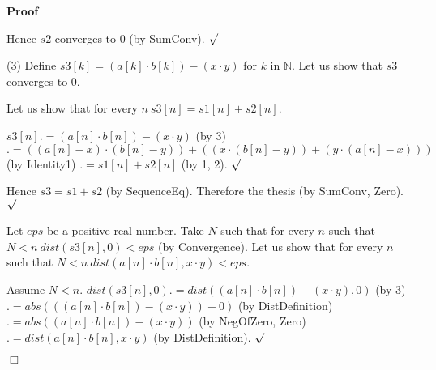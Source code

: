 \documentclass{article}
\newenvironment{forthel}{\begin{leftbar}}{\end{leftbar}}
\newenvironment{proof}{\noindent\textbf{Proof\ }}{\hspace*{\fill}$\Box$\medskip}
\newenvironment{subproof}{\begin{list}{}{}
		\item[\text{Proof}]}{\hfill $\surd$ \end{list}}
\newcommand{\NN}{\mathbb{N}}
\newcommand{\plusone}{+}
\begin{document}
\begin{forthel}
\begin{proof}
\begin{subproof}
	Hence $s2$ converges to $0$ (by SumConv).
	\end{subproof}
	(3) Define $s3[k] = (a[k] \cdot b[k]) - (x \cdot y)$ for $k$ in $\NN$.
	Let us show that $s3$ converges to $0$.
	\begin{subproof}
	Let us show that for every $n \ s3[n] = s1[n] + s2[n]$.
	\begin{subproof}
	$s3[n] .= (a[n] \cdot b[n]) - (x \cdot y)$ (by 3)
	$.= ((a[n] - x) \cdot (b[n] - y)) + ((x \cdot (b[n] - y)) + (y \cdot (a[n] - x)))$ (by Identity1)
	$.= s1[n] + s2[n]$ (by 1, 2).
	\end{subproof}
	Hence $s3 = s1 \plusone s2$ (by SequenceEq).
	Therefore the thesis (by SumConv, Zero).
	\end{subproof}
	Let $eps$ be a positive real number.
	Take $N$ such that for every $n$ such that $N < n \ dist(s3[n],0) < eps$ (by Convergence).
	Let us show that for every $n$ such that $N < n \ dist(a[n] \cdot b[n],x \cdot y) < eps$.
	\begin{subproof}
	Assume $N < n$.
	$dist(s3[n],0) .= dist((a[n] \cdot b[n]) - (x \cdot y),0)$ (by 3)
	$.= abs(((a[n] \cdot b[n]) - (x \cdot y)) - 0)$ (by DistDefinition)
	$.= abs((a[n] \cdot b[n]) - (x \cdot y))$ (by NegOfZero, Zero)
	$.= dist(a[n] \cdot b[n],x \cdot y)$ (by DistDefinition).
	\end{subproof}
	\end{proof}


\end{forthel}
\end{document}
